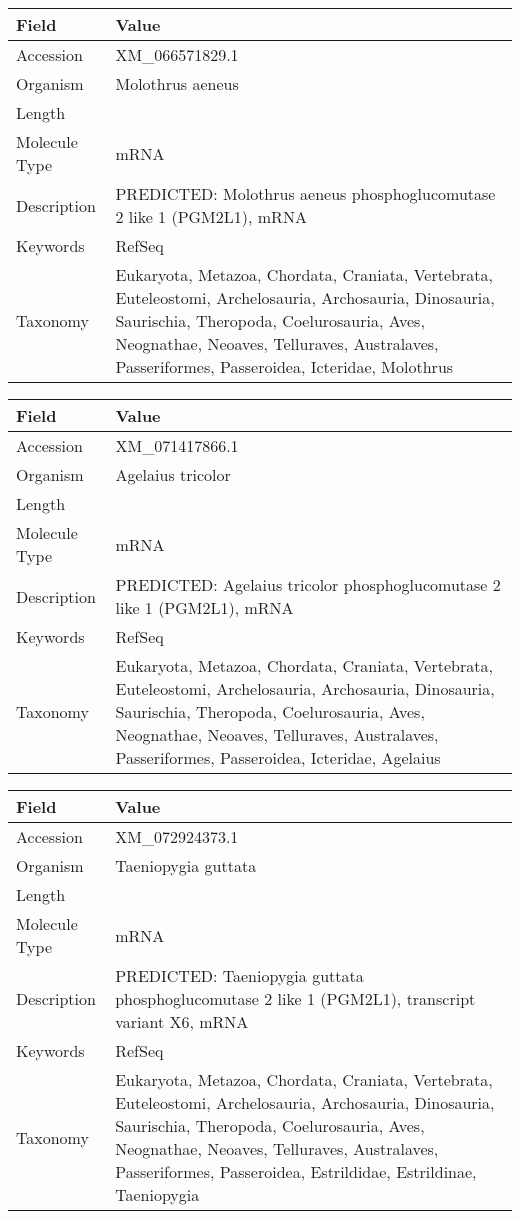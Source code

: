 \documentclass[10pt]{article}
\begin{document}
{\footnotesize
\begin{longtable}{>{\raggedright\arraybackslash}p{4.5cm} >{\raggedright\arraybackslash}p{11.5cm}}
\textbf{Field} & \textbf{Value} \\
\hline
Accession & XM\_066571829.1 \\
Organism & Molothrus aeneus \\
Length & 5393 \\
Molecule Type & mRNA \\
Description & PREDICTED: Molothrus aeneus phosphoglucomutase 2 like 1 (PGM2L1), mRNA \\
Keywords & RefSeq \\
Taxonomy & Eukaryota, Metazoa, Chordata, Craniata, Vertebrata, Euteleostomi, Archelosauria, Archosauria, Dinosauria, Saurischia, Theropoda, Coelurosauria, Aves, Neognathae, Neoaves, Telluraves, Australaves, Passeriformes, Passeroidea, Icteridae, Molothrus \\
\end{longtable}
}

{\footnotesize
\begin{longtable}{>{\raggedright\arraybackslash}p{4.5cm} >{\raggedright\arraybackslash}p{11.5cm}}
\textbf{Field} & \textbf{Value} \\
\hline
Accession & XM\_071417866.1 \\
Organism & Agelaius tricolor \\
Length & 5423 \\
Molecule Type & mRNA \\
Description & PREDICTED: Agelaius tricolor phosphoglucomutase 2 like 1 (PGM2L1), mRNA \\
Keywords & RefSeq \\
Taxonomy & Eukaryota, Metazoa, Chordata, Craniata, Vertebrata, Euteleostomi, Archelosauria, Archosauria, Dinosauria, Saurischia, Theropoda, Coelurosauria, Aves, Neognathae, Neoaves, Telluraves, Australaves, Passeriformes, Passeroidea, Icteridae, Agelaius \\
\end{longtable}
}

{\footnotesize
\begin{longtable}{>{\raggedright\arraybackslash}p{4.5cm} >{\raggedright\arraybackslash}p{11.5cm}}
\textbf{Field} & \textbf{Value} \\
\hline
Accession & XM\_072924373.1 \\
Organism & Taeniopygia guttata \\
Length & 6128 \\
Molecule Type & mRNA \\
Description & PREDICTED: Taeniopygia guttata phosphoglucomutase 2 like 1 (PGM2L1), transcript variant X6, mRNA \\
Keywords & RefSeq \\
Taxonomy & Eukaryota, Metazoa, Chordata, Craniata, Vertebrata, Euteleostomi, Archelosauria, Archosauria, Dinosauria, Saurischia, Theropoda, Coelurosauria, Aves, Neognathae, Neoaves, Telluraves, Australaves, Passeriformes, Passeroidea, Estrildidae, Estrildinae, Taeniopygia \\
\end{longtable}
}
\end{document}
